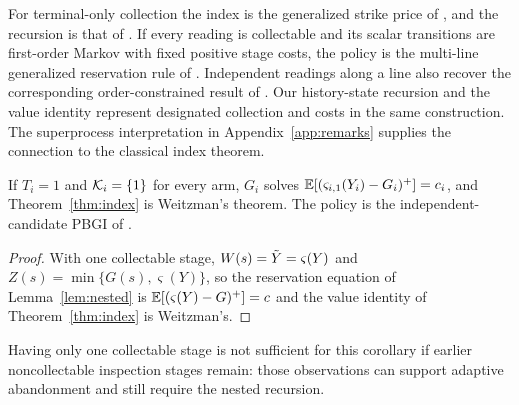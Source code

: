 For terminal-only collection the index is the generalized strike price of \citet[Appendix~G]{kleinberg2016descending}, and the recursion is that of \citet[Section~4, Definition~4]{bowers2024nested}. If every reading is collectable and its scalar transitions are first-order Markov with fixed positive stage costs, the policy is the multi-line
generalized reservation rule of \citet[Theorem~4.4]{yang2025markovian}. Independent readings
along a line also recover the corresponding order-constrained result of
\citet{boodaghians2023order}. Our history-state recursion and the value identity represent
designated collection and costs in the same construction. The superprocess interpretation
in Appendix~\ref{app:remarks} supplies the connection to the classical index theorem.

\begin{corollary}\label{cor:pbgi}
If $T_i=1$ and $\mathcal{K}_i=\{1\}$ for every arm, $G_i$ solves
$\mathbb{E}[(\varsigma_{i,1}(Y_i)-G_i)^+]=c_i$, and Theorem~\ref{thm:index} is Weitzman's theorem.
The policy is the independent-candidate PBGI of \citet{xie2024pbgi}.
\end{corollary}
\begin{proof}
With one collectable stage, $W(s)=\tilde Y=\varsigma(Y)$ and $Z(s)=\min\{G(s),\varsigma(Y)\}$, so the reservation
equation of Lemma~\ref{lem:nested} is $\mathbb{E}[(\varsigma(Y)-G)^+]=c$ and the value identity of
Theorem~\ref{thm:index} is Weitzman's.
\end{proof}

Having only one collectable stage is not sufficient for this corollary if earlier
noncollectable inspection stages remain: those observations can support adaptive abandonment
and still require the nested recursion.
